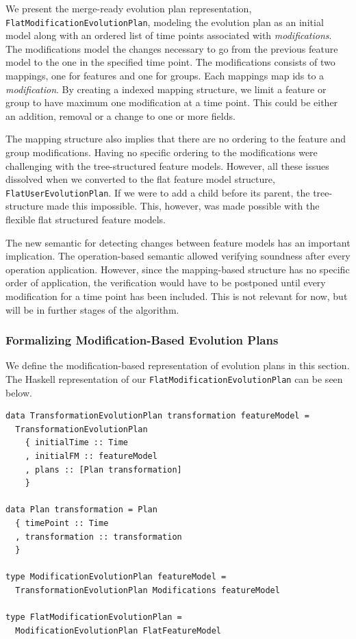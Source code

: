 \documentclass[a4paper,english]{ifimaster}
\begin{document}
We present the merge-ready evolution plan representation, \texttt{FlatModificationEvolutionPlan}, modeling the evolution plan as an initial model along with an ordered list of time points associated with \textit{modifications}. The modifications model the changes necessary to go from the previous feature model to the one in the specified time point. The modifications consists of two mappings, one for features and one for groups. Each mappings map ids to a \textit{modification}. By creating a indexed mapping structure, we limit a feature or group to have maximum one modification at a time point. This could be either an addition, removal or a change to one or more fields. 

The mapping structure also implies that there are no ordering to the feature and group modifications. Having no specific ordering to the modifications were challenging with the tree-structured feature models. However, all these issues dissolved when we converted to the flat feature model structure, \texttt{FlatUserEvolutionPlan}. If we were to add a child before its parent, the tree-structure made this impossible. This, however, was made possible with the flexible flat structured feature models.

The new semantic for detecting changes between feature models has an important implication. The operation-based semantic allowed verifying soundness after every operation application. However, since the mapping-based structure has no specific order of application, the verification would have to be postponed until every modification for a time point has been included. This is not relevant for now, but will be in further stages of the algorithm.

\subsubsection{Formalizing Modification-Based Evolution Plans}%
\label{ssub:formalizing_modification_based_evolution_plans}

We define the modification-based representation of evolution plans in this section. The Haskell representation of our \texttt{FlatModificationEvolutionPlan} can be seen below.

\begin{verbatim}
data TransformationEvolutionPlan transformation featureModel = 
  TransformationEvolutionPlan
    { initialTime :: Time
    , initialFM :: featureModel
    , plans :: [Plan transformation]
    }

data Plan transformation = Plan
  { timePoint :: Time
  , transformation :: transformation
  }

type ModificationEvolutionPlan featureModel = 
  TransformationEvolutionPlan Modifications featureModel

type FlatModificationEvolutionPlan = 
  ModificationEvolutionPlan FlatFeatureModel
\end{verbatim}
\end{document}

